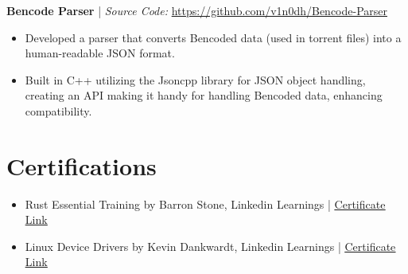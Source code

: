 \documentclass[9pt, letterpad]{extarticle}
\newcommand{\projsection}[2] {
	\raggedright{\normalsize\bfseries{#1}} | {\small \textit{Source Code:} \hspace{0.1em} \href{#2}{#2}}
}
\begin{document}
\projsection
{Bencode Parser}
{https://github.com/v1n0dh/Bencode-Parser}
\vspace*{-0.5em}
\begin{itemize}[leftmargin=6mm]
	\setlength\itemsep{0em}
	\item{Developed a parser that converts Bencoded data (used in torrent files) into a human-readable JSON format.}
	\item{Built in C++ utilizing the Jsoncpp library for JSON object handling, creating an API making it handy for handling Bencoded data, enhancing compatibility.}
\end{itemize}

\section{Certifications}
\begin{itemize}[leftmargin=6mm]
	\setlength\itemsep{0em}
	\item{Rust Essential Training by Barron Stone, Linkedin Learnings} | \href{https://www.linkedin.com/learning/certificates/5b0eb9a5191ed3a4cb605f7b8b9e5864ed123e5b13b5f8f68bfc99b6ff8cd87d?trk=share_certificate}{\underline {Certificate Link} \faExternalLink}
	\item{Linux Device Drivers by Kevin Dankwardt, Linkedin Learnings} | \href{https://www.linkedin.com/learning/certificates/ef2284b25b44e40cdb305a085b6a77f7a4f0eac3762a844f5530279dd01a9549?trk=share_certificate}{\underline {Certificate Link} \faExternalLink}
\end{itemize}
\end{document}
